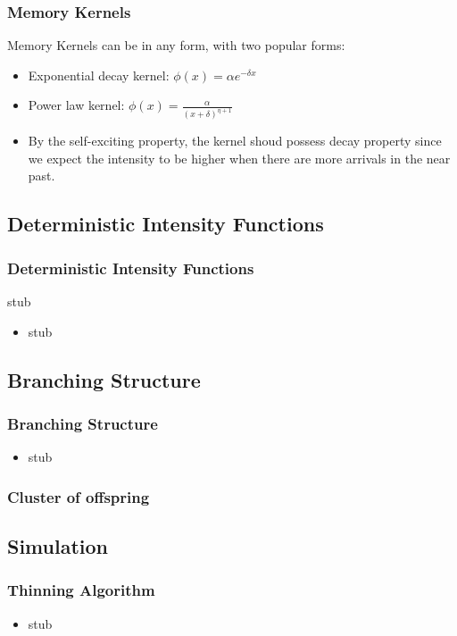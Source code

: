 \documentclass{beamer}
\begin{document}
\begin{frame}
\frametitle{Memory Kernels}
Memory Kernels can be in any form, with two popular forms:
\begin{itemize}
	\item Exponential decay kernel: $\phi(x) = \alpha e^{-\delta x}$
	\item Power law kernel: $\phi(x) = \frac{\alpha}{(x + \delta)^{\eta + 1}}$
	\item By the self-exciting property, the kernel shoud possess decay property since we expect the intensity to be higher when there are more arrivals in the near past.
\end{itemize}
\end{frame}

\subsection{Deterministic Intensity Functions}

\begin{frame}
\frametitle{Deterministic Intensity Functions}
stub
\begin{itemize}
	\item stub
\end{itemize}
\end{frame}

\subsection{Branching Structure}

\begin{frame}
\frametitle{Branching Structure}
\begin{itemize}
	\item stub
\end{itemize}
\end{frame}

\begin{frame}
\frametitle{Cluster of offspring}
\end{frame}

\subsection{Simulation}

\begin{frame}
\frametitle{Thinning Algorithm}
\begin{itemize}
	\item stub
\end{itemize}
\end{frame}
\end{document}

